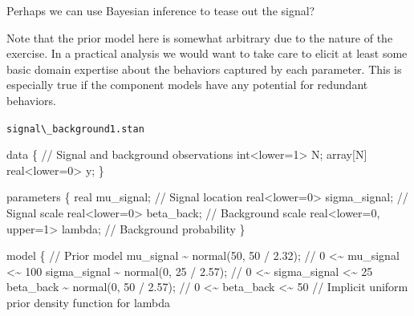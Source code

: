 \documentclass[
  letterpaper,
  DIV=11,
  numbers=noendperiod]{scrartcl}
\newenvironment{Shaded}{\begin{snugshade}}{\end{snugshade}}
\newcommand{\CommentTok}[1]{\textcolor[rgb]{0.37,0.37,0.37}{#1}}
\newcommand{\DataTypeTok}[1]{\textcolor[rgb]{0.68,0.00,0.00}{#1}}
\newcommand{\DecValTok}[1]{\textcolor[rgb]{0.68,0.00,0.00}{#1}}
\newcommand{\FloatTok}[1]{\textcolor[rgb]{0.68,0.00,0.00}{#1}}
\newcommand{\KeywordTok}[1]{\textcolor[rgb]{0.00,0.23,0.31}{#1}}
\newcommand{\NormalTok}[1]{\textcolor[rgb]{0.00,0.23,0.31}{#1}}
\begin{document}
Perhaps we can use Bayesian inference to tease out the signal?

Note that the prior model here is somewhat arbitrary due to the nature
of the exercise. In a practical analysis we would want to take care to
elicit at least some basic domain expertise about the behaviors captured
by each parameter. This is especially true if the component models have
any potential for redundant behaviors.

\begin{codelisting}

\caption{\texttt{signal\textbackslash\_background1.stan}}

\begin{Shaded}
\begin{Highlighting}[]
\KeywordTok{data}\NormalTok{ \{}
  \CommentTok{// Signal and background observations}
  \DataTypeTok{int}\NormalTok{\textless{}}\KeywordTok{lower}\NormalTok{=}\DecValTok{1}\NormalTok{\textgreater{} N;}
  \DataTypeTok{array}\NormalTok{[N] }\DataTypeTok{real}\NormalTok{\textless{}}\KeywordTok{lower}\NormalTok{=}\DecValTok{0}\NormalTok{\textgreater{} y;}
\NormalTok{\}}

\KeywordTok{parameters}\NormalTok{ \{}
  \DataTypeTok{real}\NormalTok{ mu\_signal;                }\CommentTok{// Signal location}
  \DataTypeTok{real}\NormalTok{\textless{}}\KeywordTok{lower}\NormalTok{=}\DecValTok{0}\NormalTok{\textgreater{} sigma\_signal;    }\CommentTok{// Signal scale}
  \DataTypeTok{real}\NormalTok{\textless{}}\KeywordTok{lower}\NormalTok{=}\DecValTok{0}\NormalTok{\textgreater{} beta\_back;       }\CommentTok{// Background scale}
  \DataTypeTok{real}\NormalTok{\textless{}}\KeywordTok{lower}\NormalTok{=}\DecValTok{0}\NormalTok{, }\KeywordTok{upper}\NormalTok{=}\DecValTok{1}\NormalTok{\textgreater{} lambda; }\CommentTok{// Background probability}
\NormalTok{\}}

\KeywordTok{model}\NormalTok{ \{}
  \CommentTok{// Prior model}
\NormalTok{  mu\_signal \textasciitilde{} normal(}\DecValTok{50}\NormalTok{, }\DecValTok{50}\NormalTok{ / }\FloatTok{2.32}\NormalTok{);   }\CommentTok{// 0 \textless{}\textasciitilde{} mu\_signal    \textless{}\textasciitilde{} 100}
\NormalTok{  sigma\_signal \textasciitilde{} normal(}\DecValTok{0}\NormalTok{, }\DecValTok{25}\NormalTok{ / }\FloatTok{2.57}\NormalTok{); }\CommentTok{// 0 \textless{}\textasciitilde{} sigma\_signal \textless{}\textasciitilde{}  25}
\NormalTok{  beta\_back \textasciitilde{} normal(}\DecValTok{0}\NormalTok{, }\DecValTok{50}\NormalTok{ / }\FloatTok{2.57}\NormalTok{);    }\CommentTok{// 0 \textless{}\textasciitilde{} beta\_back    \textless{}\textasciitilde{}  50}
  \CommentTok{// Implicit uniform prior density function for lambda}


\end{Highlighting}
\end{Shaded}
\end{codelisting}
\end{document}
